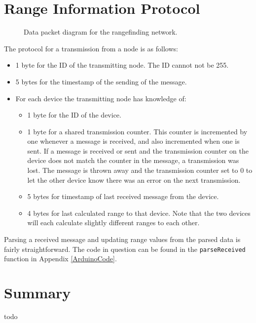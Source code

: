 \section{Range Information Protocol}
\begin{figure}
	\centering
	
	\decoRule
	\caption{Data packet diagram for the rangefinding network.}
	\label{fig:NetworkPacket}
\end{figure}

The protocol for a transmission from a node is as follows:

\begin{itemize}
	\item 1 byte for the ID of the transmitting node. The ID cannot not be 255.
	\item 5 bytes for the timestamp of the sending of the message.
	\item For each device the transmitting node has knowledge of:
	\begin{itemize}
		\item 1 byte for the ID of the device.
		\item 1 byte for a shared transmission counter. This counter is incremented by one whenever a message is received, and also incremented when one is sent. If a message is received or sent and the transmission counter on the device does not match the counter in the message, a transmission was lost. The message is thrown away and the transmission counter set to 0 to let the other device know there was an error on the next transmission.
		\item 5 bytes for timestamp of last received message from the device.
		\item 4 bytes for last calculated range to that device. Note that the two devices will each calculate slightly different ranges to each other.
	\end{itemize} 
\end{itemize}

Parsing a received message and updating range values from the parsed data is fairly straightforward. The code in question can be found in the \texttt{parseReceived} function in Appendix \ref{ArduinoCode}.

\section{Summary}
todo



